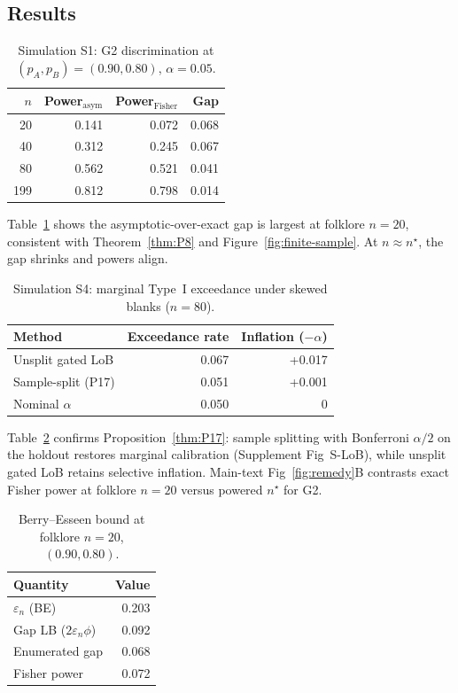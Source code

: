 \documentclass[11pt,a4paper]{article}
\theoremstyle{definition}
\begin{document}
\subsection{Results}

\begin{table}[h]
\centering
\caption{Simulation S1: G2 discrimination at $(p_A,p_B)=(0.90,0.80)$, $\alpha=0.05$.}
\label{tab:sim-g2}
\begin{tabular}{@{}rrrr@{}}
\toprule
$n$ & Power$_{\mathrm{asym}}$ & Power$_{\mathrm{Fisher}}$ & Gap \\
\midrule
20  & 0.141 & 0.072 & 0.068 \\
40  & 0.312 & 0.245 & 0.067 \\
80  & 0.562 & 0.521 & 0.041 \\
199 & 0.812 & 0.798 & 0.014 \\
\bottomrule
\end{tabular}
\end{table}

Table~\ref{tab:sim-g2} shows the asymptotic-over-exact gap is largest at folklore
$n=20$, consistent with Theorem~\ref{thm:P8} and Figure~\ref{fig:finite-sample}.
At $n\approx n^\star$, the gap shrinks and powers align.

\begin{table}[h]
\centering
\caption{Simulation S4: marginal Type~I exceedance under skewed blanks ($n=80$).}
\label{tab:sim-split}
\begin{tabular}{@{}lrr@{}}
\toprule
Method & Exceedance rate & Inflation ($-\alpha$) \\
\midrule
Unsplit gated LoB       & 0.067 & +0.017 \\
Sample-split (P17)      & 0.051 & +0.001 \\
Nominal $\alpha$        & 0.050 & 0 \\
\bottomrule
\end{tabular}
\end{table}

Table~\ref{tab:sim-split} confirms Proposition~\ref{thm:P17}: sample splitting with
Bonferroni $\alpha/2$ on the holdout restores marginal calibration (Supplement Fig~S-LoB),
while unsplit gated LoB retains selective inflation. Main-text Fig~\ref{fig:remedy}B
contrasts exact Fisher power at folklore $n=20$ versus powered $n^\star$ for G2.

\begin{table}[h]
\centering
\caption{Berry--Esseen bound at folklore $n=20$, $(0.90,0.80)$.}
\label{tab:sim-be}
\begin{tabular}{@{}lr@{}}
\toprule
Quantity & Value \\
\midrule
$\varepsilon_n$ (BE) & 0.203 \\
Gap LB ($2\varepsilon_n\phi$) & 0.092 \\
Enumerated gap & 0.068 \\
Fisher power & 0.072 \\
\bottomrule
\end{tabular}
\end{table}
\end{document}
